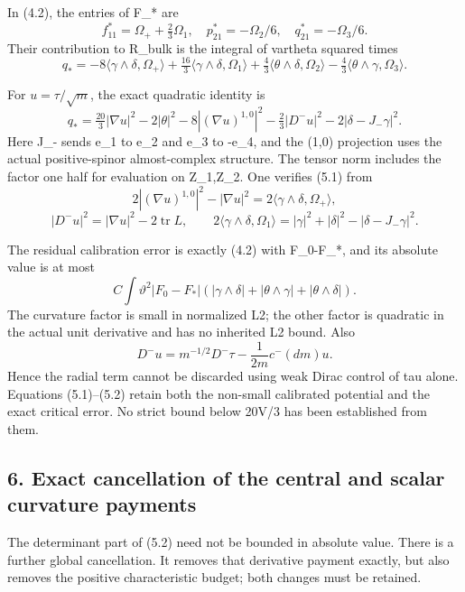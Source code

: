 \documentclass[
  10pt,
]{article}
\begin{document}
In (4.2), the entries of F\_* are \[
 f_{11}^*=\Omega_++\tfrac23\Omega_1,\quad
 p_{21}^*=-\Omega_2/6,\quad q_{21}^*=-\Omega_3/6.
\] Their contribution to R\_bulk is the integral of vartheta squared
times \[
 q_*=-8\langle\gamma\wedge\delta,\Omega_+\rangle
       +\tfrac{16}{3}\langle\gamma\wedge\delta,\Omega_1\rangle
       +\tfrac43\langle\theta\wedge\delta,\Omega_2\rangle
       -\tfrac43\langle\theta\wedge\gamma,\Omega_3\rangle.
\]

For \(u=\tau/\sqrt m\), the exact quadratic identity is \[
 \boxed{q_*=\tfrac{20}{3}|\nabla u|^2-2|\theta|^2
       -8|(\nabla u)^{1,0}|^2-\tfrac23|D^-u|^2
                                    -2|\delta-J_-\gamma|^2.}   \tag{5.1}
\] Here J\_- sends e\_1 to e\_2 and e\_3 to -e\_4, and the (1,0)
projection uses the actual positive-spinor almost-complex structure. The
tensor norm includes the factor one half for evaluation on Z\_1,Z\_2.
One verifies (5.1) from \[
 2|(\nabla u)^{1,0}|^2-|\nabla u|^2
                               =2\langle\gamma\wedge\delta,\Omega_+\rangle,
\] \[
 |D^-u|^2=|\nabla u|^2-2\operatorname{tr}L,\qquad
 2\langle\gamma\wedge\delta,\Omega_1\rangle
             =|\gamma|^2+|\delta|^2-|\delta-J_-\gamma|^2.
\]

The residual calibration error is exactly (4.2) with F\_0-F\_*, and its
absolute value is at most \[
 C\int\vartheta^2|F_0-F_*|
       (|\gamma\wedge\delta|+|\theta\wedge\gamma|+|\theta\wedge\delta|).
                                                               \tag{5.2}
\] The curvature factor is small in normalized L2; the other factor is
quadratic in the actual unit derivative and has no inherited L2 bound.
Also \[
 D^-u=m^{-1/2}D^-\tau-\frac1{2m}c^-(dm)u.
\] Hence the radial term cannot be discarded using weak Dirac control of
tau alone. Equations (5.1)--(5.2) retain both the non-small calibrated
potential and the exact critical error. No strict bound below 20V/3 has
been established from them.

\hypertarget{exact-cancellation-of-the-central-and-scalar-curvature-payments}{%
\subsection{6. Exact cancellation of the central and scalar curvature
payments}\label{exact-cancellation-of-the-central-and-scalar-curvature-payments}}

The determinant part of (5.2) need not be bounded in absolute value.
There is a further global cancellation. It removes that derivative
payment exactly, but also removes the positive characteristic budget;
both changes must be retained.
\end{document}
